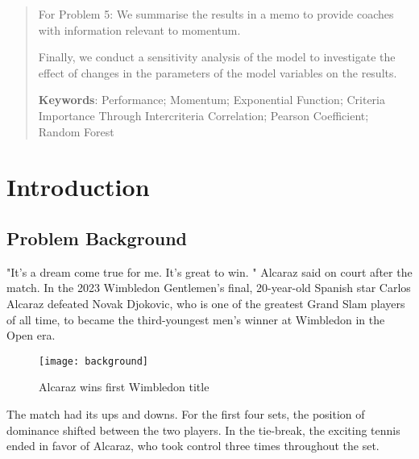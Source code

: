 \documentclass[12pt]{article}  %
\begin{document}
\begin{abstract}
		For Problem 5: We summarise the results in a memo to provide coaches with information relevant to momentum.
		
		Finally, we conduct a sensitivity analysis of the model to investigate the effect of changes in the parameters of the model variables on the results.
		
		\vspace{5pt}  
		\textbf{Keywords}: Performance; Momentum; Exponential Function; Criteria Importance Through Intercriteria Correlation; Pearson Coefficient; Random Forest%
		
	\end{abstract}
	
	\maketitle  %
	
	\tableofcontents  %

\section{Introduction}

\subsection{Problem Background}
"It's a dream come true for me. It's great to win. " Alcaraz said on court after the match.\cite{1} In the 2023 Wimbledon Gentlemen’s final, 20-year-old Spanish star Carlos Alcaraz defeated Novak Djokovic, who is one of the greatest Grand Slam players of all time, to became the third-youngest men's winner at Wimbledon in the Open era.
\begin{figure}[htbp]  %
	\centering  %
	\texttt{[image: background]} %
	\caption{Alcaraz wins first Wimbledon title\cite{2}}  
	\label{picbg}
\end{figure}
\vspace{-0.5cm}

The match had its ups and downs. For the first four sets, the position of dominance shifted between the two players. In the tie-break, the exciting tennis ended in favor of Alcaraz, who took control three times throughout the set.
\end{document}
